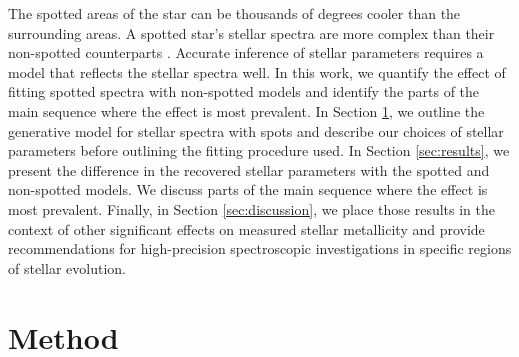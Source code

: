 The spotted areas of the star can be thousands of degrees cooler than the surrounding areas. A spotted star's stellar spectra are more complex than their non-spotted counterparts \citep{morris_stellar_2019}. Accurate inference of stellar parameters requires a model that reflects the stellar spectra well. In this work, we quantify the effect of fitting spotted spectra with non-spotted models and identify the parts of the main sequence where the effect is most prevalent.
In Section \ref{sec:methods}, we outline the generative model for stellar spectra with spots and describe our choices of stellar parameters before outlining the fitting procedure used.
In Section \ref{sec:results}, we present the difference in the recovered stellar parameters with the spotted and non-spotted models. We discuss parts of the main sequence where the effect is most prevalent. Finally, in Section \ref{sec:discussion}, we place those results in the context of other significant effects on measured stellar metallicity and provide recommendations for high-precision spectroscopic investigations in specific regions of stellar evolution.

\section{Method}
\label{sec:methods}


